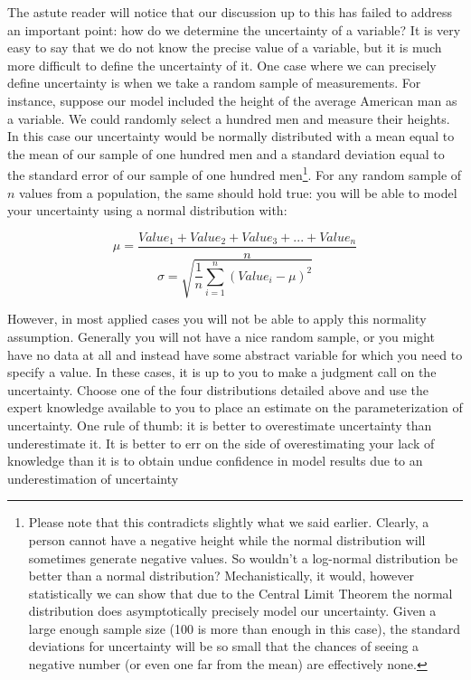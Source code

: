 \documentclass[]{memoir}
\begin{document}
The astute reader will notice that our discussion up to this has failed
to address an important point: how do we determine the uncertainty of a
variable? It is very easy to say that we do not know the precise value
of a variable, but it is much more difficult to define the uncertainty
of it. One case where we can precisely define uncertainty is when we
take a random sample of measurements. For instance, suppose our model
included the height of the average American man as a variable. We could
randomly select a hundred men and measure their heights. In this case
our uncertainty would be normally distributed with a mean equal to the
mean of our sample of one hundred men and a standard deviation equal to
the standard error of our sample of one hundred men\footnote{Please note
  that this contradicts slightly what we said earlier. Clearly, a person
  cannot have a negative height while the normal distribution will
  sometimes generate negative values. So wouldn't a log-normal
  distribution be better than a normal distribution? Mechanistically, it
  would, however statistically we can show that due to the Central Limit
  Theorem the normal distribution does asymptotically precisely model
  our uncertainty. Given a large enough sample size (100 is more than
  enough in this case), the standard deviations for uncertainty will be
  so small that the chances of seeing a negative number (or even one far
  from the mean) are effectively none.}. For any random sample of $n$
values from a population, the same should hold true: you will be able to
model your uncertainty using a normal distribution with:

\[ \mu = \frac{Value_1+Value_2+Value_3+...+Value_n}{n} \]
\[ \sigma = \sqrt{\frac{1}{n} \sum_{i=1}^n (Value_i-\mu)^2} \]

However, in most applied cases you will not be able to apply this
normality assumption. Generally you will not have a nice random sample,
or you might have no data at all and instead have some abstract variable
for which you need to specify a value. In these cases, it is up to you
to make a judgment call on the uncertainty. Choose one of the four
distributions detailed above and use the expert knowledge available to
you to place an estimate on the parameterization of uncertainty. One
rule of thumb: it is better to overestimate uncertainty than
underestimate it. It is better to err on the side of overestimating your
lack of knowledge than it is to obtain undue confidence in model results
due to an underestimation of uncertainty

\end{document}
